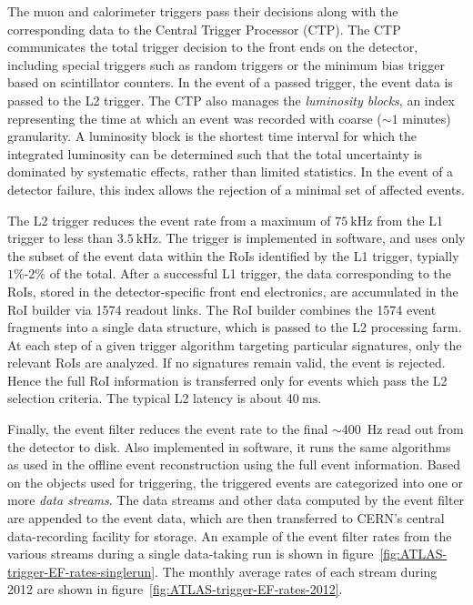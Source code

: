 The muon and calorimeter triggers pass their decisions along with the corresponding data to the Central Trigger Processor (CTP). The CTP communicates the total trigger decision to the front ends on the detector, including special triggers such as random triggers or the minimum bias trigger based on scintillator counters. In the event of a passed trigger, the event data is passed to the L2 trigger. The CTP also manages the \emph{luminosity blocks}, an index representing the time at which an event was recorded with coarse ($\sim1$ minutes) granularity. A luminosity block is the shortest time interval for which the integrated luminosity can be determined such that the total uncertainty is dominated by systematic effects, rather than limited statistics. In the event of a detector failure, this index allows the rejection of a minimal set of affected events. 

The L2 trigger reduces the event rate from a maximum of $75~\mbox{kHz}$ from the L1 trigger to less than $\SI{3.5}{\kilo\hertz}$. The trigger is implemented in software, and uses only the subset of the event data within the RoIs identified by the L1 trigger, typially $1\%$-$2\%$ of the total. After a successful L1 trigger, the data corresponding to the RoIs, stored in the detector-specific front end electronics, are accumulated in the RoI builder via 1574 readout links. The RoI builder combines the 1574 event fragments into a single data structure, which is passed to the L2 processing farm. At each step of a given trigger algorithm targeting particular signatures, only the relevant RoIs are analyzed. If no signatures remain valid, the event is rejected. Hence the full RoI information is transferred only for events which pass the L2 selection criteria. The typical L2 latency is about $\SI{40}{\milli\second}$.

Finally, the event filter reduces the event rate to the final $\sim$\SI{400}{\hertz} read out from the detector to disk. Also implemented in software, it runs the same algorithms as used in the offline event reconstruction using the full event information. Based on the objects used for triggering, the triggered events are categorized into one or more \emph{data streams}. The data streams and other data computed by the event filter are appended to the event data, which are then transferred to CERN’s central data-recording facility for storage. An example of the event filter rates from the various streams during a single data-taking run is shown in figure~\ref{fig:ATLAS-trigger-EF-rates-singlerun}. The monthly average rates of each stream during 2012 are shown in figure~\ref{fig:ATLAS-trigger-EF-rates-2012}.

